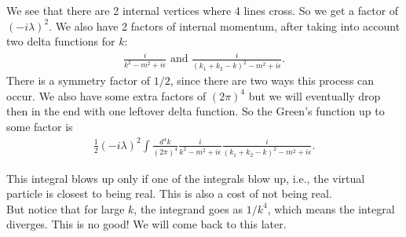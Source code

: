 \documentclass{book}
\theoremstyle{definition}
\newcommand{\f}[2]{\frac{#1}{#2}}
\begin{document}
We see that there are 2 internal vertices where 4 lines cross. So we get a factor of $(-i\lambda)^2$. We also have 2 factors of internal momentum, after taking into account two delta functions for $k$:
\begin{align}
\f{i}{k^2 - m^2 + i\epsilon} \text{ and } \f{i}{(k_1 + k_2 - k)^2 - m^2 + i\epsilon}.
\end{align}
There is a symmetry factor of $1/2$, since there are two ways this process can occur. We also have some extra factors of $(2\pi)^4$ but we will eventually drop then in the end with one leftover delta function. So the Green's function up to some factor is
\begin{align}
\f{1}{2}(-i\lambda)^2\int \f{d^4k}{(2\pi)^4}\f{i}{k^2 - m^2 + i\epsilon}\f{i}{(k_1 + k_2 - k)^2 - m^2 + i\epsilon}.
\end{align}


This integral blows up only if one of the integrals blow up, i.e., the virtual particle is closest to being real. This is also a cost of not being real. \\

But notice that for large $k$, the integrand goes as $1/k^4$, which means the integral diverges. This is no good! We will come back to this later.\\
\end{document}
